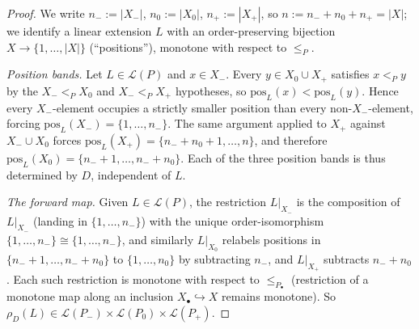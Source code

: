 \begin{proof}
We write $n_- := |X_-|$, $n_0 := |X_0|$, $n_+ := |X_+|$, so
$n := n_- + n_0 + n_+ = |X|$; we identify a linear extension $L$ with
an order-preserving bijection $X \to \{1, \ldots, |X|\}$ (``positions''),
monotone with respect to $\le_P$.

\smallskip\noindent\emph{Position bands.}
Let $L \in \mathcal L(P)$ and $x \in X_-$. Every $y \in X_0 \cup X_+$
satisfies $x <_P y$ by the $X_-<_P X_0$ and $X_-<_P X_+$ hypotheses,
so $\mathrm{pos}_L(x) < \mathrm{pos}_L(y)$. Hence every
$X_-$-element occupies a strictly smaller position than every
non-$X_-$-element, forcing $\mathrm{pos}_L(X_-)=\{1,\ldots,n_-\}$.
The same argument applied to $X_+$ against $X_- \cup X_0$ forces
$\mathrm{pos}_L(X_+)=\{n_-+n_0+1,\ldots,n\}$, and therefore
$\mathrm{pos}_L(X_0)=\{n_-+1,\ldots,n_-+n_0\}$. Each of the three
position bands is thus determined by $D$, independent of $L$.

\smallskip\noindent\emph{The forward map.}
Given $L \in \mathcal L(P)$, the restriction $L|_{X_-}$ is the
composition of $L|_{X_-}$ (landing in $\{1,\ldots,n_-\}$) with the
unique order-isomorphism $\{1,\ldots,n_-\} \cong \{1,\ldots,n_-\}$,
and similarly $L|_{X_0}$ relabels positions in
$\{n_-+1,\ldots,n_-+n_0\}$ to $\{1,\ldots,n_0\}$ by subtracting
$n_-$, and $L|_{X_+}$ subtracts $n_-+n_0$. Each such restriction is
monotone with respect to $\le_{P_\bullet}$ (restriction of a
monotone map along an inclusion $X_\bullet \hookrightarrow X$
remains monotone). So
$\rho_D(L) \in \mathcal L(P_-) \times \mathcal L(P_0) \times
\mathcal L(P_+)$.


\end{proof}
